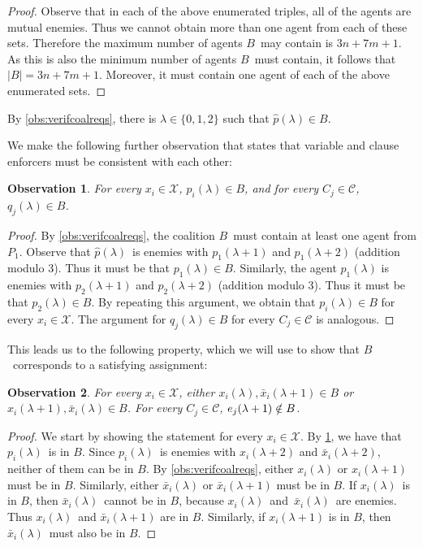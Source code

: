 \documentclass[a4paper,fleqn]{cas-sc}
\newcommand{\coalB}{\ensuremath{B}}
\newcommand{\ri}{\ensuremath{{\lambda}}}
\newcommand{\tvarN}[1]{\ensuremath{x_{#1}}}
\newcommand{\fvarN}[1]{\ensuremath{\bar{x}_{#1}}}
\newcommand{\pickN}[1]{\ensuremath{p_{#1}}}
\newcommand{\qickN}[1]{\ensuremath{q_{#1}}}
\newcommand{\mainpickN}{\ensuremath{\hat{p}}}
\newcommand{\tvar}[2]{\ensuremath{\tvarN{#1}(#2)}}
\newcommand{\fvar}[2]{\ensuremath{\fvarN{#1}(#2)}}
\newcommand{\claf}[2]{\ensuremath{\clafN{#1}(#2)}}
\newcommand{\picks}[1]{\ensuremath{P_{#1}}}
\newcommand{\pick}[2]{\ensuremath{\pickN{#1}(#2)}}
\newcommand{\qick}[2]{\ensuremath{\qickN{#1}(#2)}}
\newcommand{\mainpick}[1]{\ensuremath{\mainpickN(#1)}}
\newcommand{\ii}{\ensuremath{{i}}}
\newcommand{\cia}{\ensuremath{{j}}}
\newtheorem{obs}{Observation}
\newcommand{\vars}{\mathcal{X}}
\newcommand{\clas}{\mathcal{C}}
\begin{document}
{\begin{proof}
Observe that in each of the above enumerated triples, all of the agents are mutual enemies. Thus we cannot obtain more than one agent from each of these sets.
Therefore the maximum number of agents \coalB\ may contain is $3n + 7m +1$. As this is also the minimum number of agents \coalB\ must contain, it follows that $|\coalB| = 3n + 7m + 1$. Moreover, it must contain one agent of each of the above enumerated sets.
\end{proof}



By \cref{obs:verifcoalreqs}, there is $\ri \in \{0,1,2\}$ such that $\mainpick \ri \in \coalB$.

We make the following further observation that states that variable and clause enforcers must be consistent with each other:
\begin{obs}\label{obs:verifcoalconst}
For every $x_\ii \in \vars$, $\pick \ii \ri \in \coalB$, and for every $C_\cia \in \clas$, $\qick \cia \ri \in \coalB$.
\end{obs}
\begin{proof}\renewcommand{\qedsymbol}{$\diamond$}
By \cref{obs:verifcoalreqs}, the coalition \coalB\ must contain at least one agent from $\picks 1$.
Observe that \mainpick \ri\ is enemies with \pick 1 {\ri + 1} and \pick 1 {\ri + 2} (addition modulo 3). Thus it must be that $\pick 1 \ri \in \coalB$. 
Similarly, the agent $\pick 1 \ri$ is enemies with \pick 2 {\ri + 1} and \pick 2 {\ri + 2} (addition modulo 3). Thus it must be that $\pick 2 \ri \in \coalB$.
By repeating this argument, we obtain that $\pick \ii \ri \in \coalB$ for every $x_\ii \in \vars$.
The argument for $\qick \cia \ri \in \coalB$ for every $C_\cia \in \clas$ is analogous.
\end{proof}

This leads us to the following property, which we will use to show that \coalB\ corresponds to a satisfying assignment:
\begin{obs}\label{obs:coalverifasg}
For every $x_\ii \in \vars$, either $\tvar \ii \ri, \fvar \ii {\ri + 1} \in \coalB$ or $\tvar \ii {\ri + 1}, \fvar \ii {\ri} \in \coalB$.
For every $C_\cia \in \clas$, $\claf \cia {\ri + 1} \notin \coalB$.
\end{obs}
\begin{proof}\renewcommand{\qedsymbol}{$\diamond$}
We start by showing the statement for every $x_\ii \in \vars$.
By \cref{obs:verifcoalconst}, we have that \pick \ii \ri\ is in \coalB.
Since \pick \ii \ri\ is enemies with \tvar \ii {\ri + 2} and \fvar \ii {\ri + 2}, neither of them can be in \coalB.
By \cref{obs:verifcoalreqs}, either $\tvar \ii \ri$ or \tvar \ii {\ri + 1} must be in \coalB.
Similarly, either $\fvar \ii \ri$ or \fvar \ii {\ri + 1} must be in \coalB.
If \tvar \ii \ri\ is in \coalB, then \fvar \ii \ri\ cannot be in \coalB, because \tvar \ii \ri\ and~\fvar \ii \ri\ are enemies. Thus \tvar \ii \ri\ and \fvar \ii {\ri + 1} are in \coalB.
Similarly, if \tvar \ii {\ri + 1} is in \coalB, then \fvar \ii \ri\ must also be in \coalB.


\end{proof}}
\end{document}
